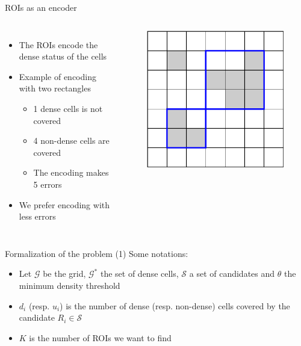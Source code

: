 \documentclass[10pt]{beamer}
\begin{document}
\begin{frame}{ROIs as an encoder}

\begin{columns}[T, onlytextwidth]
    \begin{itemize}
        \item The ROIs encode the dense status of the cells
        \item Example of encoding with two rectangles
        \begin{itemize}
            \item 1 dense cells is not covered
            \item 4 non-dense cells are covered
            \item The encoding makes 5 errors
        \end{itemize}
        \item We prefer encoding with less errors
    \end{itemize}
    
    \begin{figure}
        \centering
        \includegraphics[scale=0.5]{figures/running-example/ILP/running-ex-ilp1.pdf}
    \end{figure}
\end{columns}

\end{frame}

\begin{frame}{Formalization of the problem (1)}
Some notations:
    \begin{itemize}
        \item Let $\mathcal{G}$ be the grid, $\mathcal{G}^*$ the set of dense cells, $\mathcal{S}$ a set of candidates and $\theta$ the minimum density threshold
        \item $d_i$ (resp. $u_i$) is the number of dense (resp. non-dense) cells covered by the candidate $R_i \in \mathcal{S}$
        \item $K$ is the number of ROIs we want to find
    \end{itemize}
\end{frame}
\end{document}
